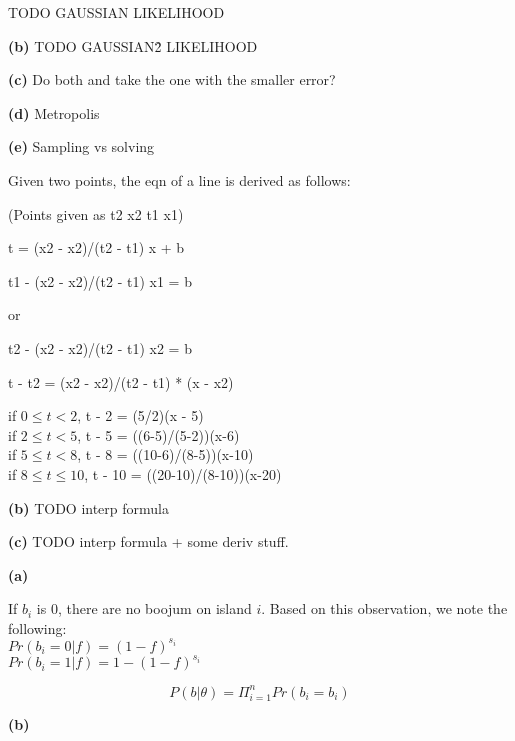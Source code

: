 \documentclass[11pt,letterpaper]{article}
\renewcommand{\part}[1] {\vspace{.10in} {\bf (#1)}}
\begin{document}
TODO GAUSSIAN LIKELIHOOD

\part{b}
TODO GAUSSIAN\^2 LIKELIHOOD

\part{c}
Do both and take the one with the smaller error?

\part{d}
Metropolis

\part{e}
Sampling vs solving

Given two points, the eqn of a line is derived as follows:

(Points given as
    t2 x2 t1 x1)

t = (x2 - x2)/(t2 - t1) x + b

    t1 - (x2 - x2)/(t2 - t1) x1 = b

    or 

    t2 - (x2 - x2)/(t2 - t1) x2 = b

t - t2 = (x2 - x2)/(t2 - t1) * (x - x2)



if $0 \leq t < 2$, t - 2 = (5/2)(x - 5)\\
if $2 \leq t < 5$, t - 5 = ((6-5)/(5-2))(x-6)\\
if $5 \leq t < 8$, t - 8 = ((10-6)/(8-5))(x-10)\\
if $8 \leq t \leq 10$, t - 10 = ((20-10)/(8-10))(x-20)

\part{b}
TODO interp formula

\part{c}
TODO interp formula + some deriv stuff.

\part{a}

If $b_i$ is 0, there are no boojum on island $i$. Based on this observation, we note the following:\\
$Pr(b_i = 0| f) = (1-f)^{s_i}$\\
$Pr(b_i = 1| f) = 1 - (1-f)^{s_i}$

$$P(b | \theta) = \Pi_{i=1}^n Pr(b_i = b_i)$$

\part{b}
\end{document}
